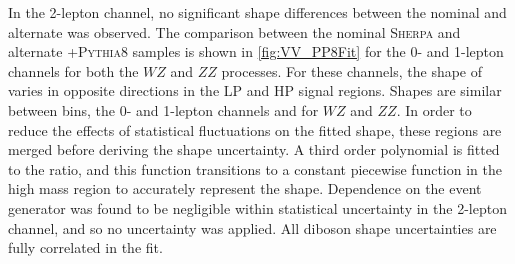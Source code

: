 In the 2-lepton channel, no significant shape differences between the nominal and alternate was observed.
The comparison between the nominal \textsc{Sherpa} and alternate \POWHEG{}+\textsc{Pythia8} samples is shown in \cref{fig:VV_PP8Fit} for the 0- and 1-lepton channels for both the $WZ$ and $ZZ$ processes.
For these channels, the shape of \mJ varies in opposite directions in the LP and HP signal regions.
Shapes are similar between \ptv bins, the 0- and 1-lepton channels and for $WZ$ and $ZZ$.
In order to reduce the effects of statistical fluctuations on the fitted shape, these regions are merged before deriving the shape uncertainty.
A third order polynomial is fitted to the ratio, and this function transitions to a constant piecewise function in the high mass region to accurately represent the shape.
Dependence on the event generator was found to be negligible within statistical uncertainty in the 2-lepton channel, and so no uncertainty was applied.
All diboson shape uncertainties are fully correlated in the fit.

